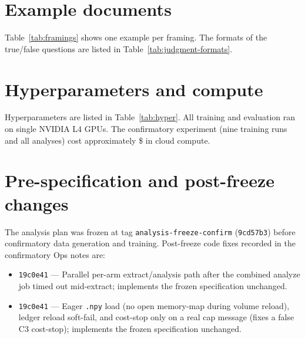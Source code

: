 \documentclass[10pt]{article}
\begin{document}
\section{Example documents}
\label{app:examples}
Table~\ref{tab:framings} shows one example per framing. The formats of the true/false questions are listed in Table~\ref{tab:judgment-formats}.

\begin{table}[t]
\centering
\caption{True/false judgment prompt formats used in training (J1--J3) and the held-out format (J4), verbatim from the training code.}
\label{tab:judgment-formats}
\small

\end{table}

\section{Hyperparameters and compute}
\label{app:hyper}
Hyperparameters are listed in Table~\ref{tab:hyper}. All training and evaluation ran on single NVIDIA L4 GPUs. The confirmatory experiment (nine training runs and all analyses) cost approximately \$\ConfirmCostUsd{} in cloud compute.

\begin{table}[t]
\centering
\caption{Confirmatory training hyperparameters.}
\label{tab:hyper}
\small

\end{table}

\section{Pre-specification and post-freeze changes}
\label{app:freeze}
The analysis plan was frozen at tag \texttt{analysis-freeze-confirm} (\texttt{9cd57b3}) before confirmatory data generation and training. Post-freeze code fixes recorded in the confirmatory Ops notes are:

\begin{itemize}
\item \texttt{19c0e41} --- Parallel per-arm extract/analysis path after the combined analyze job timed out mid-extract; implements the frozen specification unchanged.
\item \texttt{19c0e41} --- Eager \texttt{.npy} load (no open memory-map during volume reload), ledger reload soft-fail, and cost-stop only on a real cap message (fixes a false C3 cost-stop); implements the frozen specification unchanged.
\end{itemize}
\end{document}
